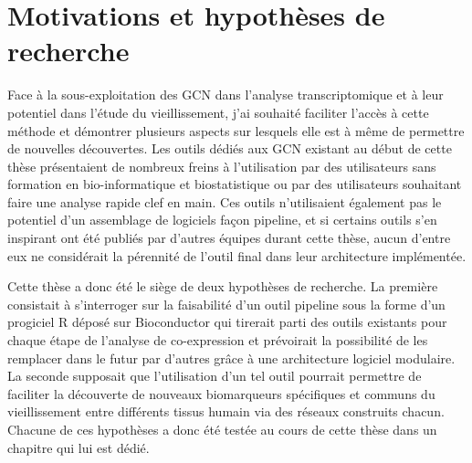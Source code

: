 \section{Motivations et hypothèses de recherche}

Face à la sous-exploitation des \acrshort{GCN} dans l'analyse \gls{transcriptomique} et à leur potentiel dans l'étude du vieillissement, j'ai souhaité faciliter l'accès à cette méthode et démontrer plusieurs aspects sur lesquels elle est à même de permettre de nouvelles découvertes. Les outils dédiés aux \acrshort{GCN} existant au début de cette thèse présentaient de nombreux freins à l'utilisation par des utilisateurs sans formation en bio-informatique et biostatistique ou par des utilisateurs souhaitant faire une analyse rapide clef en main. Ces outils n'utilisaient également pas le potentiel d'un assemblage de logiciels façon pipeline, et si certains outils s'en inspirant ont été publiés par d'autres équipes durant cette thèse, aucun d'entre eux ne considérait la pérennité de l'outil final dans leur architecture implémentée.

Cette thèse a donc été le siège de deux hypothèses de recherche. La première consistait à s'interroger sur la faisabilité d'un outil pipeline sous la forme d'un progiciel R déposé sur Bioconductor qui tirerait parti des outils existants pour chaque étape de l'analyse de co-expression et prévoirait la possibilité de les remplacer dans le futur par d'autres grâce à une architecture logiciel modulaire. La seconde supposait que l'utilisation d'un tel outil pourrait permettre de faciliter la découverte de nouveaux biomarqueurs spécifiques et communs du vieillissement entre différents tissus humain via des réseaux construits chacun. Chacune de ces hypothèses a donc été testée au cours de cette thèse dans un chapitre qui lui est dédié.




